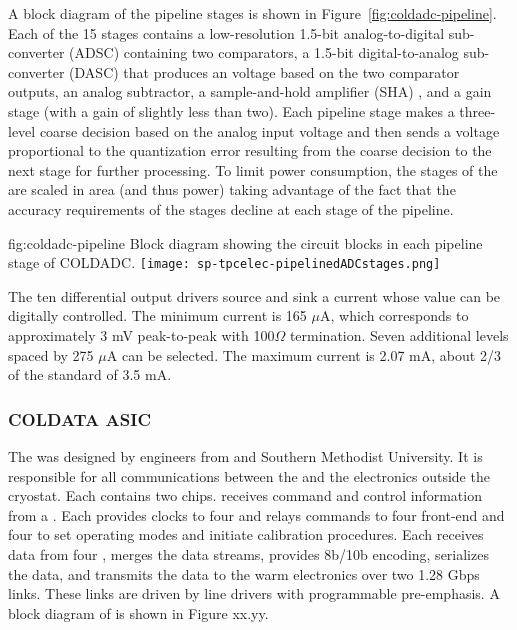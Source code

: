 A block diagram of the  pipeline stages is shown in Figure~\ref{fig:coldadc-pipeline}.  Each of the 15 stages contains a low-resolution 1.5-bit analog-to-digital sub-converter (ADSC)  containing two comparators, a 1.5-bit digital-to-analog sub-converter (DASC)  that produces an voltage based on the two comparator outputs, an analog subtractor, a sample-and-hold amplifier (SHA) , and a gain stage (with a gain of slightly less than two).  Each pipeline stage makes a three-level coarse decision based on the analog input voltage and then sends a voltage proportional to the quantization error resulting from the coarse decision to the next stage for further processing.  To limit power consumption, the stages of the  are scaled in area (and thus power) taking advantage of the fact that the accuracy requirements of the stages decline at each stage of the pipeline.

\begin{dunefigure}
{fig:coldadc-pipeline}
{Block diagram showing the circuit blocks in each pipeline stage of COLDADC.}
\texttt{[image: sp-tpcelec-pipelinedADCstages.png]}
\end{dunefigure}


The ten differential output drivers source and sink a current whose value can be digitally controlled.  The minimum current is 165 $\mu$A, which corresponds to approximately 3 mV peak-to-peak with 100$\Omega$ termination.  Seven additional levels spaced by 275 $\mu$A can be selected.  The maximum current is 2.07 mA, about 2/3 of the  standard of 3.5 mA.


\subsubsection{COLDATA ASIC}
\label{sec:fdsp-tpcelec-design-femb-coldata}

The   was designed by engineers from  and Southern Methodist University.  It is responsible for all communications between the  and the electronics outside the cryostat.  Each  contains two  chips.   receives command and control information from a .  Each  provides clocks to four  and relays commands to four  front-end  and four  to set operating modes and initiate calibration procedures.  Each  receives data from four , merges the data streams, provides 8b/10b encoding, serializes the data, and transmits the data to the warm electronics over two 1.28 Gbps links.  These links are driven by line drivers with programmable pre-emphasis.  A block diagram of  is shown in Figure xx.yy. 

